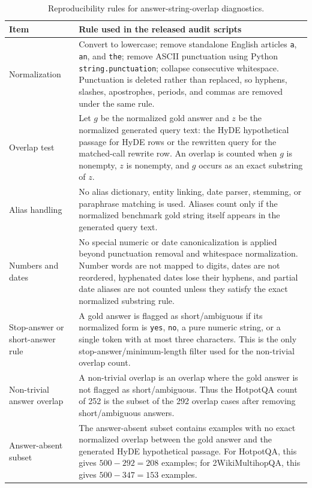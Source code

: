 \documentclass[pdflatex,sn-basic,Numbered]{sn-jnl}
\begin{document}
\begin{table}[t]
\centering
\caption{Reproducibility rules for answer-string-overlap diagnostics.}
\label{tab:answer_overlap_definition}
\scriptsize
\begin{threeparttable}
\setlength{\tabcolsep}{4pt}
\begin{tabularx}{\textwidth}{>{\raggedright\arraybackslash}p{}
                            >{\raggedright\arraybackslash}X}
\toprule
Item & Rule used in the released audit scripts \\
\midrule
Normalization & Convert to lowercase; remove standalone English articles \texttt{a}, \texttt{an}, and \texttt{the}; remove ASCII punctuation using Python \texttt{string.punctuation}; collapse consecutive whitespace. Punctuation is deleted rather than replaced, so hyphens, slashes, apostrophes, periods, and commas are removed under the same rule. \\
Overlap test & Let $g$ be the normalized gold answer and $z$ be the normalized generated query text: the HyDE hypothetical passage for HyDE rows or the rewritten query for the matched-call rewrite row. An overlap is counted when $g$ is nonempty, $z$ is nonempty, and $g$ occurs as an exact substring of $z$. \\
Alias handling & No alias dictionary, entity linking, date parser, stemming, or paraphrase matching is used. Aliases count only if the normalized benchmark gold string itself appears in the generated query text. \\
Numbers and dates & No special numeric or date canonicalization is applied beyond punctuation removal and whitespace normalization. Number words are not mapped to digits, dates are not reordered, hyphenated dates lose their hyphens, and partial date aliases are not counted unless they satisfy the exact normalized substring rule. \\
Stop-answer or short-answer rule & A gold answer is flagged as short/ambiguous if its normalized form is \texttt{yes}, \texttt{no}, a pure numeric string, or a single token with at most three characters. This is the only stop-answer/minimum-length filter used for the non-trivial overlap count. \\
Non-trivial answer overlap & A non-trivial overlap is an overlap where the gold answer is not flagged as short/ambiguous. Thus the HotpotQA count of 252 is the subset of the 292 overlap cases after removing short/ambiguous answers. \\
Answer-absent subset & The answer-absent subset contains examples with no exact normalized overlap between the gold answer and the generated HyDE hypothetical passage. For HotpotQA, this gives $500-292=208$ examples; for 2WikiMultihopQA, this gives $500-347=153$ examples. \\

\end{tabularx}
\end{threeparttable}
\end{table}
\end{document}
